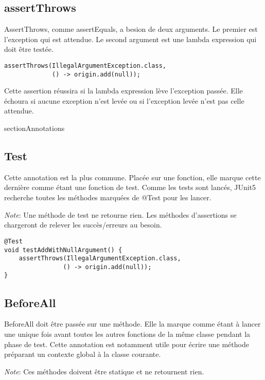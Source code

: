\documentclass[12pt]{article}		%
\begin{document}
\subsection{assertThrows}

AssertThrows, comme assertEquals, a besion de deux arguments. Le premier est l'exception qui est attendue. Le second argument est une lambda expression qui doit être testée.

\lstset{language=Java, numbers=left}
\begin{lstlisting}[basicstyle=\small]
assertThrows(IllegalArgumentException.class,
             () -> origin.add(null));
\end{lstlisting}

Cette assertion réussira si la lambda expression lève l'exception passée. Elle échoura si aucune exception n'est levée ou si l'exception levée n'est pas celle attendue.

section{Annotations}

\subsection{Test}

Cette annotation est la plus commune. Placée sur une fonction, elle marque cette dernière comme étant une fonction de test. Comme les tests sont lancés, JUnit5 recherche toutes les méthodes marquées de @Test pour les lancer.

\textit{Note}: Une méthode de test ne retourne rien. Les méthodes d'assertions se chargeront de relever les succès/erreurs au besoin.

\lstset{language=Java, numbers=left}
\begin{lstlisting}[basicstyle=\small]
@Test
void testAddWithNullArgument() {
    assertThrows(IllegalArgumentException.class,
                () -> origin.add(null));
}
\end{lstlisting}

\subsection{BeforeAll}

BeforeAll doit être passée sur une méthode. Elle la marque comme étant à lancer une unique fois avant toutes les autres fonctions de la même classe pendant la phase de test. Cette annotation est notamment utile pour écrire une méthode préparant un contexte global à la classe courante.

\textit{Note}: Ces méthodes doivent être statique et ne retournent rien.
\end{document}
